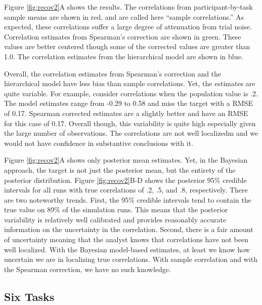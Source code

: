 \documentclass[
  ,man]{apa6}
\begin{document}
Figure \ref{fig:recov2}A shows the results. The correlations from participant-by-task sample means are shown in red, and are called here ``sample correlations.'' As expected, these correlations suffer a large degree of attenuation from trial noise. Correlation estimates from Spearman's correction are shown in green. These values are better centered though some of the corrected values are greater than 1.0. The correlation estimates from the hierarchical model are shown in blue.

Overall, the correlation estimates from Spearman's correction and the hierarchical model have less bias than sample correlations. Yet, the estimates are quite variable. For example, consider correlations when the population value is .2. The model estimates range from -0.29 to 0.58 and miss the target with a RMSE of 0.17. Spearman corrected estimates are a slightly better and have an RMSE for this case of 0.17. Overall though, this variability is quite high especially given the large number of observations. The correlations are not well localizedm and we would not have confidence in substantive conclusions with it.

Figure \ref{fig:recov2}A shows only posterior mean estimates. Yet, in the Bayesian approach, the target is not just the posterior mean, but the entirety of the posterior distribution. Figure \ref{fig:recov2}B-D shows the posterior 95\% credible intervals for all runs with true correlations of .2, .5, and .8, respectively. There are two noteworthy trends. First, the 95\% credible intervals tend to contain the true value on 89\% of the simulation runs. This means that the posterior variability is relatively well calibrated and provides reasonably accurate information on the uncertainty in the correlation. Second, there is a fair amount of uncertainty meaning that the analyst knows that correlations have not been well localized. With the Bayesian model-based estimates, at least we know how uncertain we are in localizing true correlations. With sample correlation and with the Spearman correction, we have no such knowledge.

\hypertarget{six-tasks}{%
\subsection{Six Tasks}\label{six-tasks}}
\end{document}
